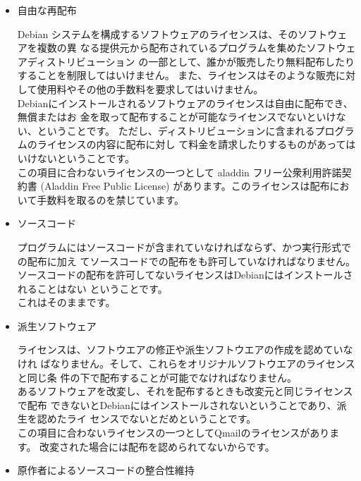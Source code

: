 \documentclass[mingoth,a4paper]{jsarticle}
\begin{document}
\begin{itemize}
 \item 自由な再配布

Debian システムを構成するソフトウェアのライセンスは、そのソフトウェアを複数の異
なる提供元から配布されているプログラムを集めたソフトウェアディストリビューション
の一部として、誰かが販売したり無料配布したりすることを制限してはいけません。
また、ライセンスはそのような販売に対して使用料やその他の手数料を要求してはいけません。
\\

Debianにインストールされるソフトウェアのライセンスは自由に配布でき、無償またはお
金を取って配布することが可能なライセンスでないといけない、ということです。
ただし、ディストリビューションに含まれるプログラムのライセンスの内容に配布に対し
て料金を請求したりするものがあってはいけないということです。
\\

この項目に合わないライセンスの一つとして aladdin フリー公衆利用許諾契約書 (Aladdin Free Public License)
があります。このライセンスは配布において手数料を取るのを禁じています。
	  
 \item ソースコード

プログラムにはソースコードが含まれていなければならず、かつ実行形式での配布に加え
てソースコードでの配布をも許可していなければなりません。
\\

ソースコードの配布を許可してないライセンスはDebianにはインストールされることはない
ということです。
\\

これはそのままです。
	  
 \item 派生ソフトウェア

ライセンスは、ソフトウエアの修正や派生ソフトウエアの作成を認めていなけれ
ばなりません。そして、これらをオリジナルソフトウエアのライセンスと同じ条
件の下で配布することが可能でなければなりません。
\\

あるソフトウェアを改変し、それを配布するときも改変元と同じライセンスで配布
できないとDebianにはインストールされないということであり、派生を認めたライ
センスでないとだめということです。
\\

この項目に合わないライセンスの一つとしてQmailのライセンスがあります。
改変された場合には配布を認められてないからです。
	  
 \item 原作者によるソースコードの整合性維持


\end{itemize}
\end{document}
